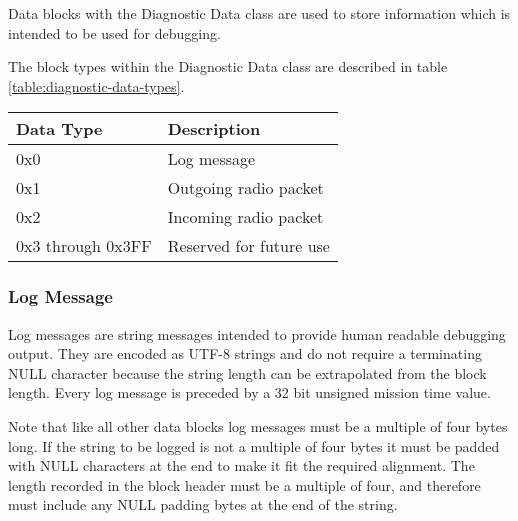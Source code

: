 Data blocks with the Diagnostic Data class are used to store information which is intended to be used for debugging.

The block types within the Diagnostic Data class are described in table \ref{table:diagnostic-data-types}.

\begin{table*}[htb]
	\centering
	\begin{tabular}{@{}ll@{}}
		\toprule
		Data Type         & Description             \\
		\midrule
		0x0               & Log message             \\
		0x1               & Outgoing radio packet   \\
		0x2               & Incoming radio packet   \\
		0x3 through 0x3FF & Reserved for future use \\
		\bottomrule
	\end{tabular}
	\caption{Diagnostic data block types}
	\label{table:diagnostic-data-types}
\end{table*}

\subsubsection{Log Message}

Log messages are string messages intended to provide human readable debugging output. They are encoded as UTF-8 strings
and do not require a terminating NULL character because the string length can be extrapolated from the block length.
Every log message is preceded by a 32 bit unsigned mission time value.

Note that like all other data blocks log messages must be a multiple of four bytes long. If the string to be logged is
not a multiple of four bytes it must be padded with NULL characters at the end to make it fit the required alignment.
The length recorded in the block header must be a multiple of four, and therefore must include any NULL padding bytes
at the end of the string.
